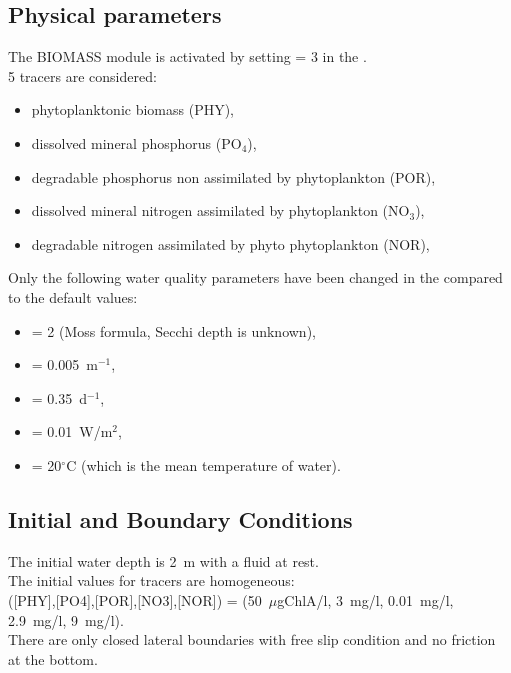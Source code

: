 \subsection{Physical parameters}

The BIOMASS module is activated by setting  = 3
in the  .\\

5 tracers are considered:
\begin{itemize}
\item phytoplanktonic biomass (PHY),
\item dissolved mineral phosphorus (PO$_4$),
\item degradable phosphorus non assimilated by phytoplankton (POR),
\item dissolved mineral nitrogen assimilated by phytoplankton (NO$_3$),
\item degradable nitrogen assimilated by phyto phytoplankton (NOR),
\end{itemize}

Only the following water quality parameters have been changed
in the \waqtel {} compared to the default values:
\begin{itemize}
\item {} = 2 (Moss formula, Secchi depth is unknown),
\item {} = 0.005~m$^{-1}$,
\item {} = 0.35~d$^{-1}$,
\item {} = 0.01~W/m$^2$,
\item {} = 20$^\circ$C (which is the mean temperature of water).
\end{itemize}

\subsection{Initial and Boundary Conditions}

The initial water depth is 2~m with a fluid at rest.\\
%
The initial values for tracers are homogeneous:\\
([PHY],[PO4],[POR],[NO3],[NOR]) =
(50~$\mu$gChlA/l, 3~mg/l, 0.01~mg/l, 2.9~mg/l, 9~mg/l).\\
%
There are only closed lateral boundaries with free slip condition and no
friction at the bottom.

